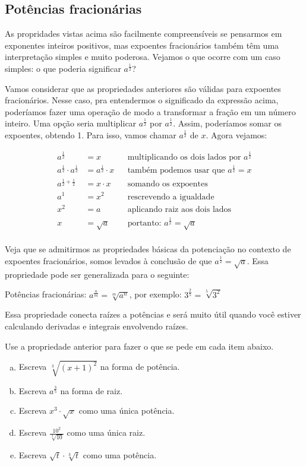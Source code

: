 \documentclass[main_estudante.tex]{subfiles}
\begin{document}
\subsection*{Potências fracionárias}

As propridades vistas acima são facilmente compreensíveis se pensarmos em exponentes inteiros positivos, mas expoentes fracionários também têm uma interpretação simples e muito poderosa. Vejamos o que ocorre com um caso simples: o que poderia significar $a^\frac{1}{2}$? 

Vamos considerar que as propriedades anteriores são válidas para expoentes fracionários. Nesse caso, pra entendermos o significado da expressão acima, poderíamos fazer uma operação de modo a transformar a fração em um número inteiro. Uma opção seria multiplicar $a^\frac{1}{2}$ por $a^\frac{1}{2}$. Assim, poderíamos somar os expoentes, obtendo 1. Para isso, vamos chamar $a^\frac{1}{2}$ de $x$. Agora vejamos:

\begin{align*}
a^\frac{1}{2} &= x && \text{multiplicando os dois lados por } a^\frac{1}{2} \\
a^\frac{1}{2} \cdot a^\frac{1}{2} &= a^\frac{1}{2} \cdot x && \text{também podemos usar que } a^\frac{1}{2} = x \\
a^{\frac{1}{2}+\frac{1}{2}} &= x \cdot x && \text{somando os expoentes}\\
a^1 &= x^2 && \text{rescrevendo a igualdade}\\
x^2 &= a && \text{aplicando raiz aos dois lados}\\
x &= \sqrt{a} && \text{portanto: } a^\frac{1}{2} = \sqrt{a} \\
\end{align*}

Veja que se admitirmos as propriedades básicas da potenciação no contexto de expoentes fracionários, somos levados à conclusão de que $a^\frac{1}{2} = \sqrt{a}$. Essa propriedade pode ser generalizada para o seguinte:

\begin{shaded*}
 Potências fracionárias: $a^\frac{n}{m}  = \sqrt[m]{a^n}$, por exemplo: $3^{\frac{2}{5}}=\sqrt[5]{3^2}$
\end{shaded*}

Essa propriedade conecta raízes a potências e será muito útil quando você estiver calculando derivadas e integrais envolvendo raízes.

\begin{questao}
Use a propriedade anterior para fazer o que se pede em cada item abaixo.
\begin{enumerate}[a)]
\item Escreva $\sqrt[3]{(x+1)^2}$ na forma de potência.
\item Escreva  $a^{\frac{3}{5}}$ na forma de raiz.
\item Escreva $x^3 \cdot \sqrt{x}$ como uma única potência.
\item Escreva $\frac{10^2}{\sqrt[3]{10}}$ como uma única raiz.
\item Escreva $\sqrt{t} \cdot \sqrt[3]{t}$ como uma potência.
\end{enumerate}
\end{questao}
\end{document}
